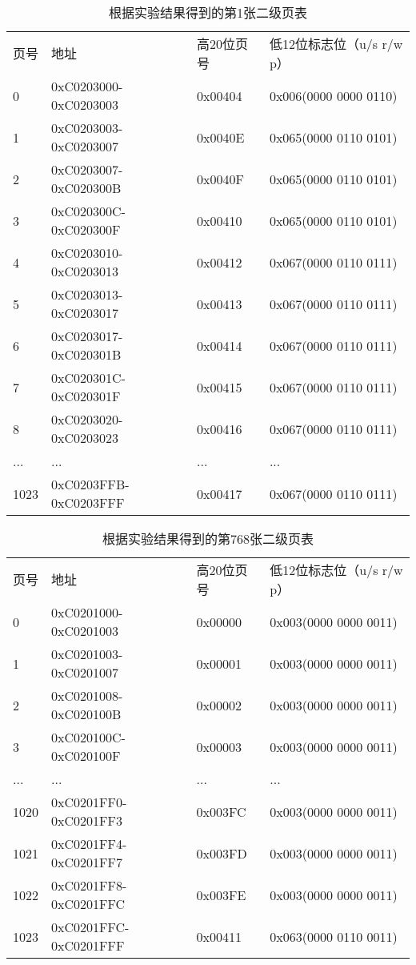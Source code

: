 \begin{table}[htbp]
\centering
 \begin{tabular}{llll}\toprule
    页号 & 地址    & 高20位页号  & 低12位标志位（u/s r/w p）\\
    0&0xC0203000-0xC0203003&0x00404&0x006(0000 0000 0110)\\
    1&0xC0203003-0xC0203007&0x0040E&0x065(0000 0110 0101)\\
    2&0xC0203007-0xC020300B&0x0040F&0x065(0000 0110 0101)\\
    3&0xC020300C-0xC020300F&0x00410&0x065(0000 0110 0101)\\
    4&0xC0203010-0xC0203013&0x00412&0x067(0000 0110 0111)\\
    5&0xC0203013-0xC0203017&0x00413&0x067(0000 0110 0111)\\
    6&0xC0203017-0xC020301B&0x00414&0x067(0000 0110 0111)\\
    7&0xC020301C-0xC020301F&0x00415&0x067(0000 0110 0111)\\
    8&0xC0203020-0xC0203023&0x00416&0x067(0000 0110 0111)\\
    ...      &...&...&...        \\
    1023&0xC0203FFB-0xC0203FFF&0x00417&0x067(0000 0110 0111)\\
   \bottomrule
\end{tabular}
\caption{根据实验结果得到的第1张二级页表}\label{page1_after}
\end{table}

\begin{table}[htbp]
\centering
 \begin{tabular}{llll}\toprule
    页号 & 地址    & 高20位页号  & 低12位标志位（u/s r/w p）\\
    0&0xC0201000-0xC0201003&0x00000&0x003(0000 0000 0011)\\
    1&0xC0201003-0xC0201007&0x00001&0x003(0000 0000 0011)\\
    2&0xC0201008-0xC020100B&0x00002&0x003(0000 0000 0011)\\
    3&0xC020100C-0xC020100F&0x00003&0x003(0000 0000 0011)\\
 ...      &...&...&...        \\
    1020&0xC0201FF0-0xC0201FF3&0x003FC&0x003(0000 0000 0011)\\
    1021&0xC0201FF4-0xC0201FF7&0x003FD&0x003(0000 0000 0011)\\
    1022&0xC0201FF8-0xC0201FFC&0x003FE&0x003(0000 0000 0011)\\
    1023&0xC0201FFC-0xC0201FFF&0x00411&0x063(0000 0110 0011)\\
   \bottomrule
\end{tabular}
\caption{根据实验结果得到的第768张二级页表}\label{page768_after}
\end{table}
